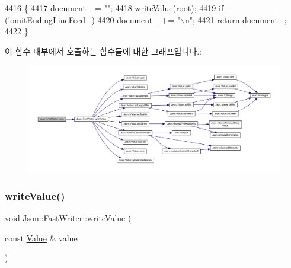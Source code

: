 \begin{DoxyCode}
4416                                                   \{
4417   \hyperlink{class_json_1_1_fast_writer_a5e08c44579db8704dba1ebe37d39fdba}{document\_} = \textcolor{stringliteral}{""};
4418   \hyperlink{class_json_1_1_fast_writer_a2ef4a2ce13a341171f01f414f4fdd765}{writeValue}(root);
4419   \textcolor{keywordflow}{if} (!\hyperlink{class_json_1_1_fast_writer_abd6e13851db6dcf59d84af68d48d50ac}{omitEndingLineFeed\_})
4420     \hyperlink{class_json_1_1_fast_writer_a5e08c44579db8704dba1ebe37d39fdba}{document\_} += \textcolor{stringliteral}{"\(\backslash\)n"};
4421   \textcolor{keywordflow}{return} \hyperlink{class_json_1_1_fast_writer_a5e08c44579db8704dba1ebe37d39fdba}{document\_};
4422 \}
\end{DoxyCode}
이 함수 내부에서 호출하는 함수들에 대한 그래프입니다.\+:
\nopagebreak
\begin{figure}[H]
\begin{center}
\leavevmode
\includegraphics[width=350pt]{class_json_1_1_fast_writer_a93d45ba4bc312371d08beb3e3dfbe654_cgraph}
\end{center}
\end{figure}
\mbox{\label{class_json_1_1_fast_writer_a2ef4a2ce13a341171f01f414f4fdd765}} 
\subsubsection{\texorpdfstring{write\+Value()}{writeValue()}}
{\footnotesize\ttfamily void Json\+::\+Fast\+Writer\+::write\+Value (\begin{DoxyParamCaption}\item[{const \hyperlink{class_json_1_1_value}{Value} \&}]{value }\end{DoxyParamCaption})\hspace{0.3cm}{\ttfamily [private]}}



